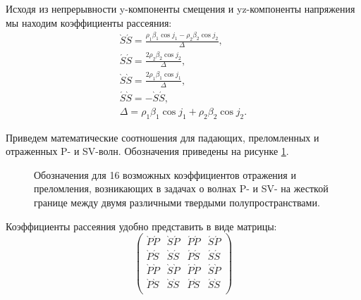 Исходя из непрерывности y-компоненты смещения и yz-компоненты напряжения мы находим коэффициенты рассеяния:
\begin{eqnarray}
\grave{S}\acute{S} = \frac{\rho_1 \beta_1 \cos{j_1} - \rho_2 \beta_2 \cos{j_2}}{\Delta}, \nonumber\\
\acute{S}\acute{S} = \frac{2 \rho_2 \beta_2 \cos{j_2}}{\Delta}, \nonumber\\
\grave{S}\grave{S} = \frac{2 \rho_1 \beta_1 \cos{j_1}}{\Delta}, \nonumber\\
\acute{S}\grave{S} = - \grave{S}\acute{S}, \nonumber\\
\Delta = \rho_1 \beta_1 \cos{j_1} + \rho_2 \beta_2 \cos{j_2}.
\end{eqnarray}

Приведем математические соотношения для падающих, преломленных и отраженных P- и SV-волн. Обозначения приведены на рисунке \ref{fig32}.

\begin{figure}[h]
\caption{Обозначения для 16 возможных коэффициентов отражения и преломления, возникающих в задачах о волнах P- и SV- на жесткой границе между двумя различными твердыми полупространствами.}
\label{fig32}
\end{figure}

Коэффициенты рассеяния удобно представить в виде матрицы:
\begin{displaymath}
\left( \begin{array}{cccc}
\grave{P}\acute{P} & \grave{S}\acute{P} & \acute{P}\acute{P} & \acute{S}\acute{P} \\
\grave{P}\acute{S} & \grave{S}\acute{S} & \acute{P}\acute{S} & \acute{S}\acute{S} \\
\grave{P}\grave{P} & \grave{S}\grave{P} & \acute{P}\grave{P} & \acute{S}\grave{P} \\
\grave{P}\grave{S} & \grave{S}\grave{S} & \acute{P}\grave{S} & \acute{S}\grave{S} \\
\end{array} \right)
\end{displaymath} 

